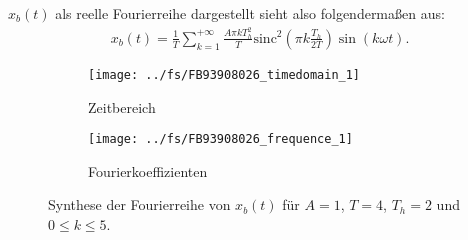 \documentclass[11pt,a4paper,DIV=12]{scrartcl}
\newcommand{\sinc}{\mathrm{sinc}}
\begin{document}
%
$x_{b}(t)$ als reelle Fourierreihe dargestellt sieht also folgendermaßen aus:
\begin{align}
	x_{b}(t)=\frac{1}{T}\sum_{k=1}^{+\infty}\frac{A\pi kT_h^2}{T}\sinc^2\left(\pi k\frac{T_h}{2T}\right)\sin(k\omega t).
\end{align}
\begin{figure}
	\centering
	\begin{subfigure}{\textwidth}
		\texttt{[image: ../fs/FB93908026\_timedomain\_1]}
		\caption{Zeitbereich}
	\end{subfigure}
	\begin{subfigure}{\textwidth}
		\texttt{[image: ../fs/FB93908026\_frequence\_1]}
		\caption{Fourierkoeffizienten}
	\end{subfigure}
	\caption{Synthese der Fourierreihe von $x_b(t)$ für $A=1$, $T=4$, $T_h=2$ und $0\leq k\leq 5$.}
\end{figure}
\newpage
\end{document}
